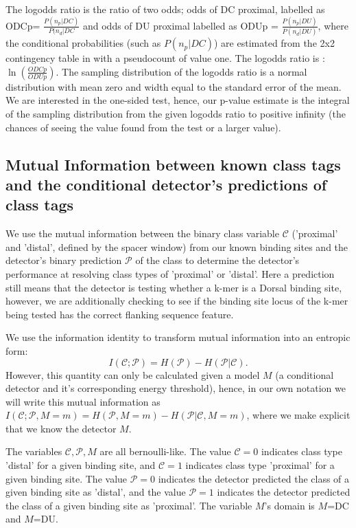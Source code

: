 \par
  The logodds ratio is the ratio of two odds; odds of DC proximal, labelled as ODCp= $\frac{P(n_p|DC)}{P(n_d|DC}$ and odds of DU proximal labelled as ODUp = $\frac{P(n_p|DU)}{P(n_d|DU)}$, where the conditional probabilities (such as $P(n_p|DC)$) are estimated from the 2x2 contingency table in  with a pseudocount of value one.  The logodds ratio is : $\ln(\frac{ODCp}{ODUp})$.  The sampling distribution of the logodds ratio is a normal distribution with mean zero and width equal to the standard error of the mean.  We are interested in the one-sided test, hence, our p-value estimate is the integral of the sampling distribution from the given logodds ratio to positive infinity (the chances of seeing the value found from the test or a larger value).
  
 
 \subsection{Mutual Information between known class tags and the conditional detector's predictions of class tags}\label{misup}
 
We use the mutual information between the binary class variable $\mathcal C$ ('proximal' and 'distal', defined by the spacer window) from our known binding sites and the detector's binary prediction $\mathcal P$ of the class to determine the detector's performance at resolving class types of 'proximal' or 'distal'.  Here a prediction still means that the detector is testing whether a k-mer is a Dorsal binding site, however, we are additionally checking to see if the binding site locus of the k-mer being tested has the correct flanking sequence feature.

  We use the information identity to transform mutual information into an entropic form:
\begin{equation}  
   I(\mathcal C;\mathcal P)=H(\mathcal P)-H(\mathcal P|\mathcal C).
\end{equation}   
     However, this quantity can only be calculated given a model $M$ (a conditional detector and it's corresponding energy threshold), hence, in our own notation we will write this mutual information as $I(\mathcal C;\mathcal P,M=m)=H(\mathcal P,M=m)-H(\mathcal P|\mathcal C,M=m)$, where we make explicit that we know the detector $M$.
     
The variables $\mathcal C, \mathcal P, M$ are all bernoulli-like.   The value $\mathcal C=0$ indicates class type 'distal' for a given binding site, and $\mathcal C=1$ indicates class type 'proximal' for a given binding site.  The value $\mathcal P=0$ indicates the detector predicted the class of a given binding site as 'distal', and the value $\mathcal P=1$ indicates the detector predicted the class of a given binding site as 'proximal'.  The variable $M$'s domain is $M$=DC and $M$=DU.  
     
